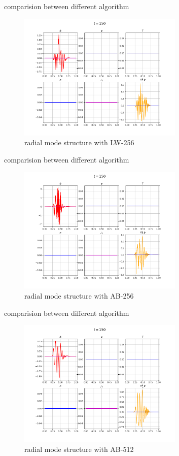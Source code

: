 \documentclass{beamer}
\begin{document}
\begin{frame}{comparision between different algorithm}
\begin{figure}[H]
	\centering
	\includegraphics[width=0.7\textwidth]{../lw-256-150.png}
	\caption{radial mode structure with LW-256}
\end{figure}
\end{frame}	

\begin{frame}{comparision between different algorithm}
\begin{figure}[H]
	\centering
	\includegraphics[width=0.7\textwidth]{../ab-256-150.png}
	\caption{radial mode structure with AB-256}
\end{figure}
\end{frame}	


\begin{frame}{comparision between different algorithm}
\begin{figure}[H]
	\centering
	\includegraphics[width=0.7\textwidth]{../ab-512-150.png}
	\caption{radial mode structure with AB-512}
\end{figure}
\end{frame}	
\end{document}
